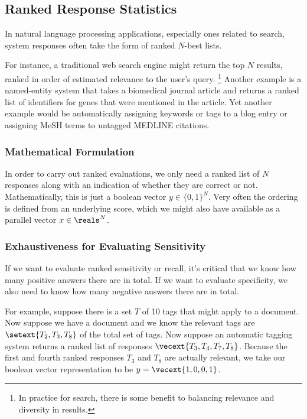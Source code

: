 \subsection{Ranked Response Statistics}

In natural language processing applications, especially ones related
to search, system responses often take the form of ranked $N$-best
lists.  

For instance, a traditional web search engine might return the
top $N$ results, ranked in order of estimated relevance to the user's
query.%
%
\footnote{In practice for search, there is some benefit to balancing
  relevance and diversity in results.}
%
Another example is a named-entity system that takes a biomedical
journal article and returns a ranked list of identifiers for genes
that were mentioned in the article.  Yet another example would be
automatically assigning keywords or tags to a blog entry or assigning
MeSH terms to untagged MEDLINE citations.

\subsubsection{Mathematical Formulation}

In order to carry out ranked evaluations, we only need a ranked list
of $N$ responses along with an indication of whether they are correct
or not.  Mathematically, this is just a boolean vector $y \in \{ 0, 1
\}^N$.  Very often the ordering is defined from an underlying score,
which we might also have available as a parallel vector $x \in
\reals^N$.

\subsubsection{Exhaustiveness for Evaluating Sensitivity}

If we want to evaluate ranked sensitivity or recall, it's critical
that we know how many positive answers there are in total.  If we want
to evaluate specificity, we also need to know how many negative
answers there are in total.

For example, suppose there is a set $T$ of 10 tags that might apply to
a document.  Now suppose we have a document and we know the relevant
tags are $\setext{T_2, T_3, T_8}$ of the total set of tags.  Now
suppose an automatic tagging system returns a ranked list of responses
$\vecext{T_3, T_4, T_7, T_8}$.  Because the first and fourth ranked
responses $T_3$ and $T_8$ are actually relevant, we take our boolean
vector representation to be $y = \vecext{1, 0, 0, 1}$.  

